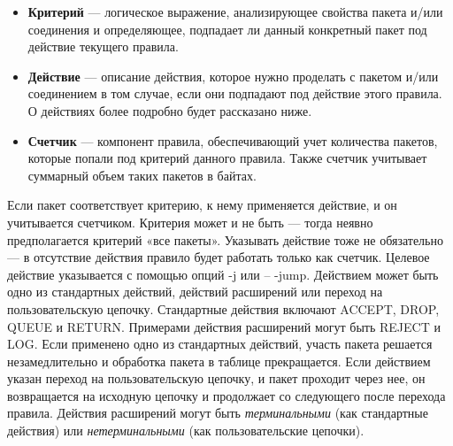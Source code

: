 \documentclass[a4paper]{article}
\begin{document}
\begin{itemize}
			\begin{itemize}
				\item 
				\textbf{Критерий} — логическое выражение, анализирующее свойства пакета и/или соединения и определяющее, подпадает ли данный конкретный пакет под действие текущего правила.
				\item 
				\textbf{Действие} — описание действия, которое нужно проделать с пакетом и/или соединением в том случае, если они подпадают под действие этого правила. О действиях более подробно будет рассказано ниже.
				\item 
				\textbf{Счетчик} — компонент правила, обеспечивающий учет количества пакетов, которые попали под критерий данного правила. Также счетчик учитывает суммарный объем таких пакетов в байтах.
			\end{itemize}
		Если пакет соответствует критерию, к нему применяется действие, и он учитывается счетчиком. Критерия может и не быть — тогда неявно предполагается критерий «все пакеты». Указывать действие тоже не обязательно — в отсутствие действия правило будет работать только как счетчик. Целевое действие указывается с помощью опций -j или -- -jump. Действием может быть одно из стандартных действий, действий расширений или переход на пользовательскую цепочку. Стандартные действия включают ACCEPT, DROP, QUEUE и RETURN. Примерами действия расширений могут быть REJECT и LOG. Если применено одно из стандартных действий, участь пакета решается незамедлительно и обработка пакета в таблице прекращается. Если действием указан переход на пользовательскую цепочку, и пакет проходит через нее, он возвращается на исходную цепочку и продолжает со следующего после перехода правила. Действия расширений могут быть \emph{терминальными} (как стандартные действия) или \emph{нетерминальными} (как пользовательские цепочки).
		

\end{itemize}
\end{document}
